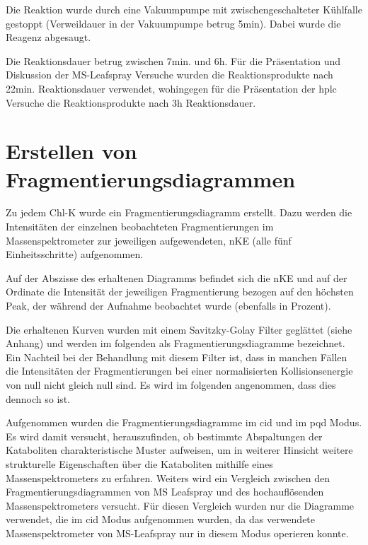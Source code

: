 Die Reaktion wurde durch eine Vakuumpumpe mit zwischengeschalteter Kühlfalle gestoppt (Verweildauer in der Vakuumpumpe betrug  5min). Dabei wurde die Reagenz abgesaugt. 

Die Reaktionsdauer betrug zwischen 7min. und 6h. Für die Präsentation und Diskussion der MS-Leafspray Versuche wurden die Reaktionsprodukte nach 22min. Reaktionsdauer verwendet, wohingegen für die Präsentation der \gls{hplc} Versuche die Reaktionsprodukte nach 3h Reaktionsdauer.

\section{Erstellen von Fragmentierungsdiagrammen} \label{sec:fragmentierungsdiagramme}

Zu jedem \gls{Chl-K} wurde ein Fragmentierungsdiagramm erstellt. Dazu werden die Intensitäten der einzelnen beobachteten Fragmentierungen im Massenspektrometer zur jeweiligen aufgewendeten, \gls{nKE} (alle fünf Einheitsschritte) aufgenommen. 

Auf der Abszisse des erhaltenen Diagramms befindet sich die \gls{nKE} und auf der Ordinate die Intensität der jeweiligen Fragmentierung bezogen auf den höchsten Peak, der während der Aufnahme beobachtet wurde (ebenfalls in Prozent). 

Die erhaltenen Kurven wurden mit einem Savitzky-Golay Filter geglättet (siehe Anhang) und werden im folgenden als Fragmentierungsdiagramme bezeichnet. Ein Nachteil bei der Behandlung mit diesem Filter ist, dass in manchen Fällen die Intensitäten der Fragmentierungen bei einer normalisierten Kollisionsenergie von null nicht gleich null sind. Es wird im folgenden angenommen, dass dies dennoch so ist.

Aufgenommen wurden die Fragmentierungsdiagramme im \gls{cid} und im \gls{pqd} Modus.\\

Es wird damit versucht, herauszufinden, ob bestimmte Abspaltungen der Kataboliten charakteristische Muster aufweisen, um in weiterer Hinsicht weitere strukturelle Eigenschaften über die Kataboliten mithilfe eines Massenspektrometers zu erfahren. Weiters wird ein Vergleich zwischen den Fragmentierungsdiagrammen von MS Leafspray und des hochauflösenden Massenspektrometers versucht. Für diesen Vergleich wurden nur die Diagramme verwendet, die im \gls{cid} Modus aufgenommen wurden, da das verwendete Massenspektrometer von MS-Leafspray nur in diesem Modus operieren konnte.